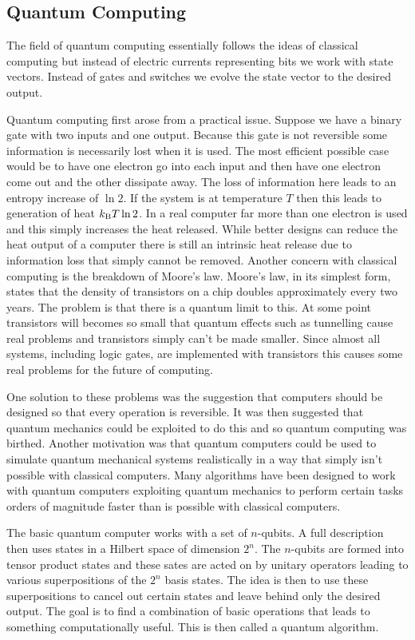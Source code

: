     \subsection{Quantum Computing}
    The field of quantum computing essentially follows the ideas of classical computing but instead of electric currents representing bits we work with state vectors.
    Instead of gates and switches we evolve the state vector to the desired output.
    
    Quantum computing first arose from a practical issue.
    Suppose we have a binary gate with two inputs and one output.
    Because this gate is not reversible some information is necessarily lost when it is used.
    The most efficient possible case would be to have one electron go into each input and then have one electron come out and the other dissipate away.
    The loss of information here leads to an entropy increase of \(\ln 2\).
    If the system is at temperature \(T\) then this leads to generation of heat \(k_\mathrm{B} T\ln 2\).
    In a real computer far more than one electron is used and this simply increases the heat released.
    While better designs can reduce the heat output of a computer there is still an intrinsic heat release due to information loss that simply cannot be removed.
    Another concern with classical computing is the breakdown of Moore's law.
    Moore's law, in its simplest form, states that the density of transistors on a chip doubles approximately every two years.
    The problem is that there is a quantum limit to this.
    At some point transistors will becomes so small that quantum effects such as tunnelling cause real problems and transistors simply can't be made smaller.
    Since almost all systems, including logic gates, are implemented with transistors this causes some real problems for the future of computing.
    
    One solution to these problems was the suggestion that computers should be designed so that every operation is reversible.
    It was then suggested that quantum mechanics could be exploited to do this and so quantum computing was birthed.
    Another motivation was that quantum computers could be used to simulate quantum mechanical systems realistically in a way that simply isn't possible with classical computers.
    Many algorithms have been designed to work with quantum computers exploiting quantum mechanics to perform certain tasks orders of magnitude faster than is possible with classical computers.
    
    The basic quantum computer works with a set of \(n\)-qubits.
    A full description then uses states in a Hilbert space of dimension \(2^n\).
    The \(n\)-qubits are formed into tensor product states and these sates are acted on by unitary operators leading to various superpositions of the \(2^n\) basis states.
    The idea is then to use these superpositions to cancel out certain states and leave behind only the desired output.
    The goal is to find a combination of basic operations that leads to something computationally useful.
    This is then called a quantum algorithm.
    

